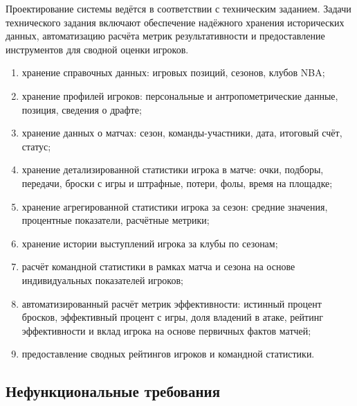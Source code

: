 Проектирование системы ведётся в соответствии с техническим заданием.
Задачи технического задания включают обеспечение надёжного хранения
исторических данных, автоматизацию расчёта метрик результативности
и предоставление инструментов для сводной оценки игроков.

\begin{enumerate}
    \item хранение справочных данных: игровых позиций, сезонов, клубов NBA;
    \item хранение профилей игроков: персональные и антропометрические данные,
          позиция, сведения о драфте;
    \item хранение данных о матчах: сезон, команды-участники, дата, итоговый
          счёт, статус;
    \item хранение детализированной статистики игрока в матче: очки, подборы,
          передачи, броски с игры и штрафные, потери, фолы, время на площадке;
    \item хранение агрегированной статистики игрока за сезон: средние значения,
          процентные показатели, расчётные метрики;
    \item хранение истории выступлений игрока за клубы по сезонам;
    \item расчёт командной статистики в рамках матча и сезона на основе
          индивидуальных показателей игроков;
    \item автоматизированный расчёт метрик эффективности: истинный процент
          бросков, эффективный процент с игры, доля владений в атаке,
          рейтинг эффективности и вклад игрока на основе первичных фактов матчей;
    \item предоставление сводных рейтингов игроков и командной статистики.
\end{enumerate}

\subsection{Нефункциональные требования}\label{sec:nfr}

